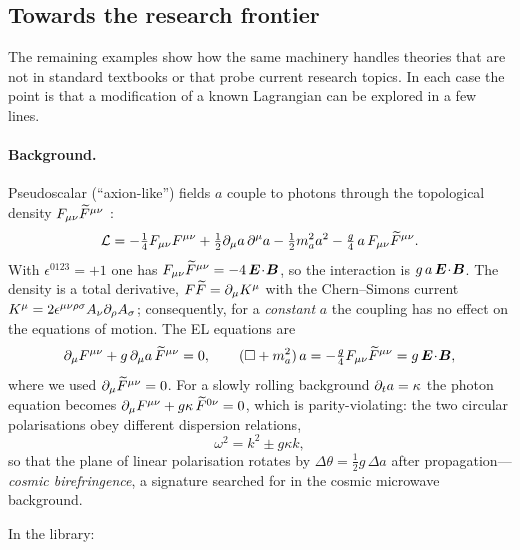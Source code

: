 \subsection{Towards the research frontier}
\label{sec:frontier}

The remaining examples show how the same machinery handles theories that are not in standard textbooks or that probe current research topics. In each case the point is that a modification of a known Lagrangian can be explored in a few lines.


\paragraph{Background.} Pseudoscalar (``axion-like'') fields $a$ couple to photons through the topological density $F_{\mu\nu}\widetilde{F}^{\mu\nu}$ \cite{Wilczek1987,CarrollFieldJackiw1990}:
\begin{equation}
\mathcal L=-\tfrac14F_{\mu\nu}F^{\mu\nu}+\tfrac12\partial_\mu a\,\partial^\mu a-\tfrac12m_a^2a^2-\tfrac g4\,a\,F_{\mu\nu}\widetilde{F}^{\mu\nu}.
\end{equation}
With $\epsilon^{0123}=+1$ one has $F_{\mu\nu}\widetilde{F}^{\mu\nu}=-4\,\bm{E}\!\cdot\!\bm{B}$, so the interaction is $g\,a\,\bm{E}\!\cdot\!\bm{B}$. The density is a total derivative, $F\widetilde{F}=\partial_\mu K^\mu$ with the Chern--Simons current $K^\mu=2\epsilon^{\mu\nu\rho\sigma}A_\nu\partial_\rho A_\sigma$; consequently, for a \emph{constant} $a$ the coupling has no effect on the equations of motion. The EL equations are
\begin{equation}
\partial_\mu F^{\mu\nu}+g\,\partial_\mu a\,\widetilde{F}^{\mu\nu}=0,\qquad(\square+m_a^2)\,a=-\tfrac g4F_{\mu\nu}\widetilde{F}^{\mu\nu}=g\,\bm{E}\!\cdot\!\bm{B},
\end{equation}
where we used $\partial_\mu\widetilde{F}^{\mu\nu}=0$. For a slowly rolling background $\partial_t a=\kappa$ the photon equation becomes $\partial_\mu F^{\mu\nu}+g\kappa\,\widetilde{F}^{0\nu}=0$, which is parity-violating: the two circular polarisations obey different dispersion relations,
\begin{equation}
\omega^2=k^2\pm g\kappa k,
\end{equation}
so that the plane of linear polarisation rotates by $\Delta\theta=\tfrac12g\,\Delta a$ after propagation---\emph{cosmic birefringence}, a signature searched for in the cosmic microwave background.

In the library:


